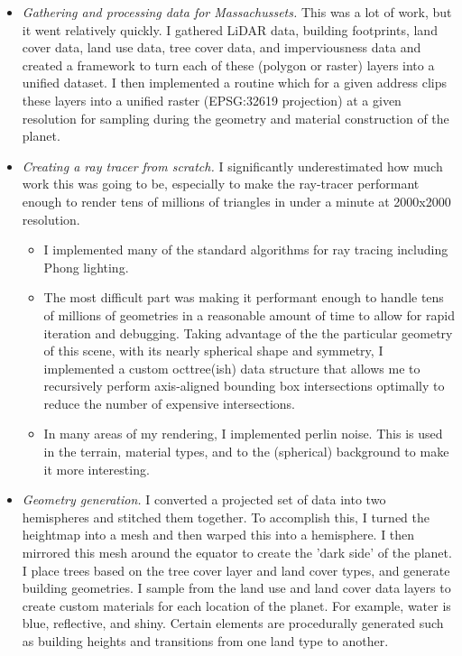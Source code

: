 \documentclass{amsart}
\begin{document}
\begin{itemize}

\item \emph{Gathering and processing data for Massachussets.} This was a lot of work, but it went relatively quickly. 
I gathered LiDAR data, building footprints, land cover data, land use data, tree cover data, and imperviousness data and created a framework to turn each of these (polygon or raster)
layers into a unified dataset. I then implemented a routine which for a given address clips these layers into a unified raster (EPSG:32619 projection) at a given resolution for sampling during the geometry and material construction of the planet. 
\item \emph{Creating a ray tracer from scratch.} I significantly underestimated how much work this was going to be, especially to make the ray-tracer performant enough to render 
tens of millions of triangles in under a minute at 2000x2000 resolution. 
  \begin{itemize}
      \item I implemented many of the standard algorithms for ray tracing including Phong lighting.
      \item The most difficult part was making it performant enough to handle tens of millions of geometries in a reasonable amount of time to allow for rapid iteration and debugging. Taking advantage of the 
the particular geometry of this scene, with its nearly spherical shape and symmetry, I implemented a custom octtree(ish) data structure that allows me to 
recursively perform axis-aligned bounding box intersections optimally to reduce the number of expensive intersections.
      \item In many areas of my rendering, I implemented perlin noise. This is used in the terrain, material types, and to the (spherical) background to make it more interesting.
  \end{itemize}
  \item \emph{Geometry generation.} I converted a projected set of data into two hemispheres and stitched them together. To accomplish this, I turned the heightmap into a mesh and then warped this into a hemisphere. I then mirrored this 
  mesh around the equator to create the 'dark side' of the planet. I place trees based on the tree cover layer and land cover types, and generate building geometries. I sample from the land use and land cover data layers to create custom materials for each location of the planet. For example, water is blue, reflective, and shiny. Certain elements are procedurally generated such as building heights and transitions from one land type to another.

\end{itemize}
\end{document}
